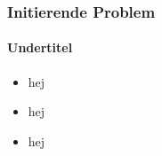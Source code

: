 
\begin{frame}
\frametitle{Initierende Problem}
\framesubtitle{Undertitel} %
    \begin{itemize}
        \item{hej}
        \pause
        \item{hej}
        \pause
        \item{hej}
    \end{itemize}
\end{frame}

